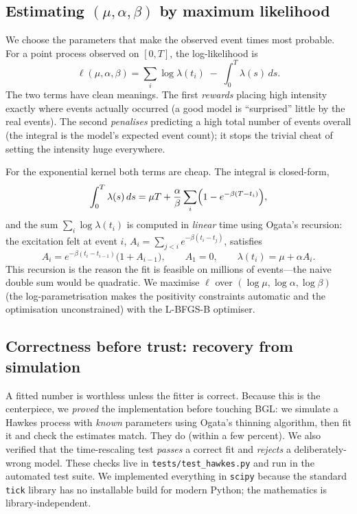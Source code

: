 \documentclass[11pt,a4paper]{article}
\newcommand{\code}[1]{\texttt{\small #1}}
\begin{document}
\subsection{Estimating $(\mu,\alpha,\beta)$ by maximum likelihood}
We choose the parameters that make the observed event times most probable. For a
point process observed on $[0,T]$, the log-likelihood is
\begin{equation}
\ell(\mu,\alpha,\beta)=\sum_i \log\lambda(t_i)\;-\;\int_0^T\lambda(s)\,ds.
\label{eq:ll}
\end{equation}
The two terms have clean meanings. The first \emph{rewards} placing high
intensity exactly where events actually occurred (a good model is ``surprised''
little by the real events). The second \emph{penalises} predicting a high total
number of events overall (the integral is the model's expected event count); it
stops the trivial cheat of setting the intensity huge everywhere.

For the exponential kernel both terms are cheap. The integral is closed-form,
\begin{equation}
\int_0^T\lambda(s)\,ds=\mu T+\frac{\alpha}{\beta}\sum_i\Bigl(1-e^{-\beta(T-t_i)}\Bigr),
\end{equation}
and the sum $\sum_i\log\lambda(t_i)$ is computed in \emph{linear} time using
Ogata's recursion: the excitation felt at event $i$,
$A_i=\sum_{j<i}e^{-\beta(t_i-t_j)}$, satisfies
\begin{equation}
A_i=e^{-\beta(t_i-t_{i-1})}\bigl(1+A_{i-1}\bigr),\qquad A_1=0,
\qquad \lambda(t_i)=\mu+\alpha A_i.
\end{equation}
This recursion is the reason the fit is feasible on millions of events---the naive
double sum would be quadratic. We maximise $\ell$ over $(\log\mu,\log\alpha,
\log\beta)$ (the log-parametrisation makes the positivity constraints automatic
and the optimisation unconstrained) with the L-BFGS-B optimiser.

\subsection{Correctness before trust: recovery from simulation}
A fitted number is worthless unless the fitter is correct. Because this is the
centerpiece, we \emph{proved} the implementation before touching BGL: we simulate
a Hawkes process with \emph{known} parameters using Ogata's thinning algorithm,
then fit it and check the estimates match. They do (within a few percent). We also
verified that the time-rescaling test \emph{passes} a correct fit and
\emph{rejects} a deliberately-wrong model. These checks live in
\code{tests/test\_hawkes.py} and run in the automated test suite. We implemented
everything in \code{scipy} because the standard \code{tick} library has no
installable build for modern Python; the mathematics is library-independent.
\end{document}
